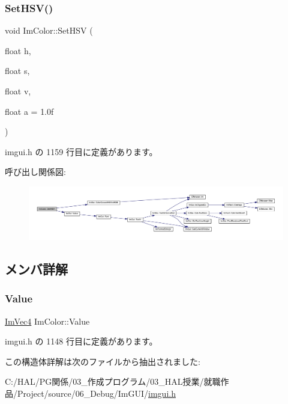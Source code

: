 \subsubsection{\texorpdfstring{Set\+H\+S\+V()}{SetHSV()}}
{\footnotesize\ttfamily void Im\+Color\+::\+Set\+H\+SV (\begin{DoxyParamCaption}\item[{float}]{h,  }\item[{float}]{s,  }\item[{float}]{v,  }\item[{float}]{a = {\ttfamily 1.0f} }\end{DoxyParamCaption})\hspace{0.3cm}{\ttfamily [inline]}}



 imgui.\+h の 1159 行目に定義があります。

呼び出し関係図\+:\nopagebreak
\begin{figure}[H]
\begin{center}
\leavevmode
\includegraphics[width=350pt]{struct_im_color_afcff20160db703b956d56e5a9fa88e24_cgraph}
\end{center}
\end{figure}


\subsection{メンバ詳解}
\mbox{\label{struct_im_color_a4cf43bd58e30decaa0248f839fc85e95}} 
\subsubsection{\texorpdfstring{Value}{Value}}
{\footnotesize\ttfamily \mbox{\hyperlink{struct_im_vec4}{Im\+Vec4}} Im\+Color\+::\+Value}



 imgui.\+h の 1148 行目に定義があります。



この構造体詳解は次のファイルから抽出されました\+:\begin{DoxyCompactItemize}
\item 
C\+:/\+H\+A\+L/\+P\+G関係/03\+\_\+作成プログラム/03\+\_\+\+H\+A\+L授業/就職作品/\+Project/source/06\+\_\+\+Debug/\+Im\+G\+U\+I/\mbox{\hyperlink{imgui_8h}{imgui.\+h}}\end{DoxyCompactItemize}
